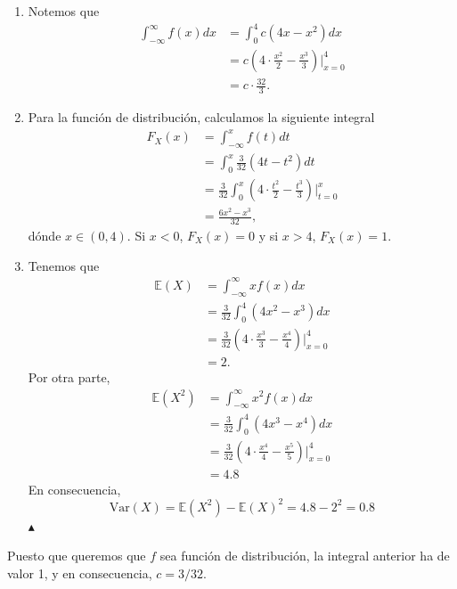 \documentclass[12pt,a4paper]{article}
\theoremstyle{plain}
\theoremstyle{definition}
\theoremstyle{remark}
\newcommand{\E}{\mathbb{E}}
\begin{document}
\begin{enumerate}
    \item[(i)] Notemos que
        \begin{align*}
            \int_{-\infty}^{\infty}f(x)dx &= \int_{0}^{4}c\left(4x-x^2\right)dx \\
            &= c\left(4\cdot \frac{x^2}{2}-\frac{x^3}{3}\right)\big|_{x=0}^{4} \\
            &= c\cdot\frac{32}{3}.
        \end{align*}
    \item[(ii)] Para la función de distribución, calculamos la siguiente integral
        \begin{align*}
            F_X(x) &= \int_{-\infty}^{x}f(t)dt \\
            &= \int_{0}^{x}\frac{3}{32}\left(4t-t^2\right)dt \\
            &= \frac{3}{32}\int_{0}^{x}\left(4\cdot \frac{t^2}{2}-\frac{t^3}{3}\right)\big|_{t=0}^{x} \\
            &= \frac{6x^2-x^3}{32},
        \end{align*}
        dónde $x\in (0,4)$. Si $x<0$, $F_X(x)=0$ y si $x>4$, $F_X(x)=1$.
    \item[(iii)] Tenemos que
        \begin{align*}
            \E\left(X\right) &= \int_{-\infty}^{\infty}xf(x)dx \\
            &= \frac{3}{32}\int_{0}^{4}\left(4x^2-x^3\right)dx \\
            &= \frac{3}{32}\left(4\cdot\frac{x^3}{3}-\frac{x^4}{4}\right)\Big|_{x=0}^{4} \\
            &= 2.
        \end{align*}
        Por otra parte,
        \begin{align*}
            \E\left(X^2\right) &= \int_{-\infty}^{\infty}x^2f(x)dx \\
            &= \frac{3}{32}\int_{0}^{4}\left(4x^3-x^4\right)dx \\
            &= \frac{3}{32}\left(4\cdot\frac{x^4}{4}-\frac{x^5}{5}\right)\Big|_{x=0}^4 \\
            &= 4.8
        \end{align*}
        En consecuencia,
        \[
        \text{Var}(X) = \E(X^2)-\E(X)^2 = 4.8 - 2^2 = 0.8
        \]
        \hfill $\blacktriangle$
\end{enumerate}
Puesto que queremos que $f$ sea función de distribución, la integral anterior ha de valor 1, y en consecuencia, $c=3/32$.
\end{document}
